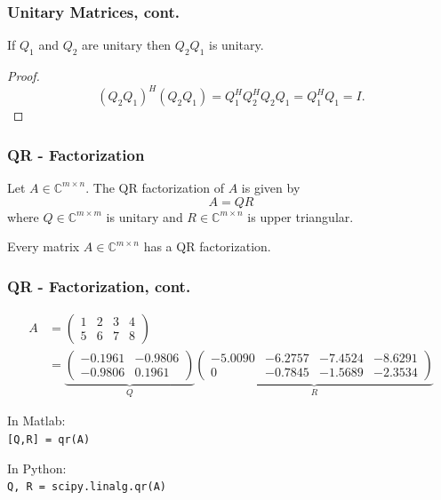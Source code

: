 \documentclass{beamer}
\begin{document}
\begin{frame}\frametitle{Unitary Matrices, cont.}
	\begin{lemma}
		If 	$Q_1$ and $Q_2$ are unitary then $Q_2Q_1$ is unitary.
	\end{lemma}
	\begin{proof}
		\[ 
			(Q_2Q_1)^H(Q_2Q_1) 
				= Q_1^HQ_2^HQ_2Q_1 
				= Q_1^HQ_1 
				= I.
		\]
	\end{proof}
\end{frame}


\begin{frame}\frametitle{QR - Factorization}
	\begin{definition}
		Let $A \in \mathbb{C}^{m \times n}$.  The QR factorization of $A$ is given by
		\[ 
			A = QR 
		\]
		where $Q \in \mathbb{C}^{m \times m}$ is unitary and $R \in \mathbb{C}^{m\times n}$ is upper triangular.
	\end{definition}
	\begin{lemma}
		Every matrix $A\in\mathbb{C}^{m \times n}$ has a QR factorization.	
	\end{lemma}
\end{frame}

\begin{frame}\frametitle{QR - Factorization, cont.}
	\begin{example}
		\begin{align*}
		A &= \begin{pmatrix}
				1 & 2 & 3 & 4\\
				5 & 6 & 7 & 8
			\end{pmatrix} \\
		&= 
			\underbrace{
				\begin{pmatrix}
					-0.1961 & -0.9806 \\
					-0.9806 & 0.1961 
		  		\end{pmatrix}
		  	}_Q
		  	\underbrace{
		  		\begin{pmatrix}
					-5.0090 & -6.2757 & -7.4524 & -8.6291\\
					0 & -0.7845 & -1.5689 & -2.3534
		  		\end{pmatrix}
		  	}_R
		\end{align*}
	\end{example}
		
	\vfill
	
	In Matlab: \\
	\texttt{[Q,R] = qr(A)}
	
	\vfill
	
	In Python: \\
	\texttt{Q, R = scipy.linalg.qr(A)}
\end{frame}
\end{document}
